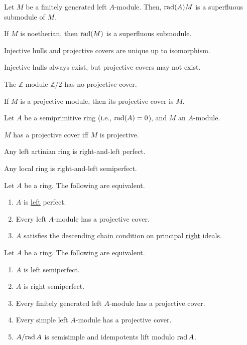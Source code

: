 \documentclass[12pt]{article}
\begin{document}
\begin{thm}
	Let $M$ be a finitely generated left $A$-module. 
	Then, $\operatorname{rad}(A)M$ is a superfluous submodule of $M$.

	If $M$ is noetherian, then $\operatorname{rad}(M)$ is a superfluous submodule.
\end{thm}

\begin{thm}
	Injective hulls and projective covers are unique up to isomorphism.

	Injective hulls always exist, but projective covers may not exist.
\end{thm}
\begin{ex}
	The $\mathbb{Z}$-module $\mathbb{Z}/2$ has no projective cover.
\end{ex}

\begin{thm}
	If $M$ is a projective module, then its projective cover is $M$.
\end{thm}

\begin{thm}
	Let $A$ be a semiprimitive ring (i.e., $\operatorname{rad}(A) = 0$), and $M$ an $A$-module. 

	$M$ has a projective cover iff $M$ is projective.
\end{thm}

\begin{thm}
	Any left artinian ring is right-and-left perfect. 

	Any local ring is right-and-left semiperfect.
\end{thm}

\begin{thm}
	Let $A$ be a ring. The following are equivalent.
	\begin{enumerate}[label=(\alph*)]
		\item $A$ is \underline{left} perfect.
		\item Every left $A$-module has a projective cover. 
		\item $A$ satisfies the descending chain condition on principal \underline{right} ideals.
	\end{enumerate}
\end{thm}

\begin{thm}
	Let $A$ be a ring. The following are equivalent.
	\begin{enumerate}[label=(\alph*)]
		\item $A$ is left semiperfect.
		\item $A$ is right semiperfect.
		\item Every finitely generated left $A$-module has a projective cover. 
		\item Every simple left $A$-module has a projective cover. 
		\item $A/{\operatorname{rad} A}$ is semisimple and idempotents lift modulo $\operatorname{rad} A$.
	\end{enumerate}
\end{thm}
\end{document}
